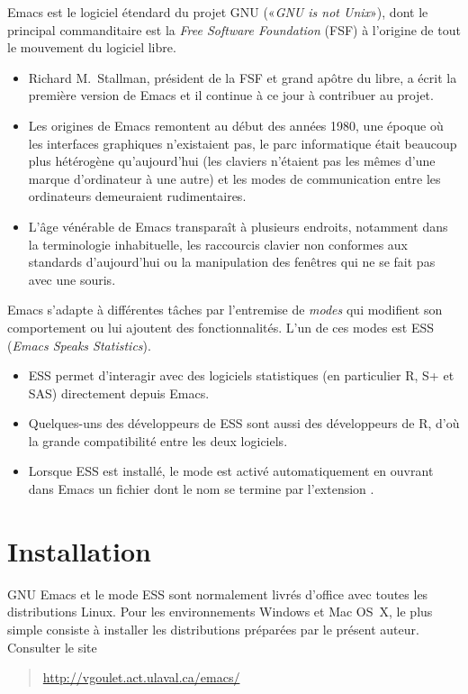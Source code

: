 Emacs est le logiciel étendard du projet GNU («\emph{GNU is not
  Unix}»), dont le principal commanditaire est la \emph{Free Software
  Foundation} (FSF) à l'origine de tout le mouvement du logiciel
libre.
\begin{itemize}
\item Richard M.\ Stallman, président de la FSF et grand apôtre du
  libre, a écrit la première version de Emacs et il continue à ce jour
  à contribuer au projet.
\item Les origines de Emacs remontent au début des années 1980, une
  époque où les interfaces graphiques n'existaient pas, le parc
  informatique était beaucoup plus hétérogène qu'aujourd'hui (les
  claviers n'étaient pas les mêmes d'une marque d'ordinateur à une
  autre) et les modes de communication entre les ordinateurs
  demeuraient rudimentaires.
\item L'âge vénérable de Emacs transparaît à plusieurs endroits,
  notamment dans la terminologie inhabituelle, les raccourcis clavier
  non conformes aux standards d'aujourd'hui ou la manipulation des
  fenêtres qui ne se fait pas avec une souris.
\end{itemize}

Emacs s'adapte à différentes tâches par l'entremise de \emph{modes}
qui modifient son comportement ou lui ajoutent des fonctionnalités.
L'un de ces modes est ESS (\emph{Emacs Speaks Statistics}).
\begin{itemize}
\item ESS permet d'interagir avec des logiciels statistiques (en
  particulier R, S+ et SAS) directement depuis Emacs.
\item Quelques-uns des développeurs de ESS sont aussi des développeurs
  de R, d'où la grande compatibilité entre les deux logiciels.
\item Lorsque ESS est installé, le mode est activé automatiquement en
  ouvrant dans Emacs un fichier dont le nom se termine par l'extension
  .
\end{itemize}


\section{Installation}
\label{emacs+ess:installation}

GNU Emacs et le mode ESS sont normalement livrés d'office avec toutes
les distributions Linux. Pour les environnements Windows et Mac OS~X,
le plus simple consiste à installer les distributions préparées par le
présent auteur. Consulter le site
\begin{quote}
  \url{http://vgoulet.act.ulaval.ca/emacs/}
\end{quote}


